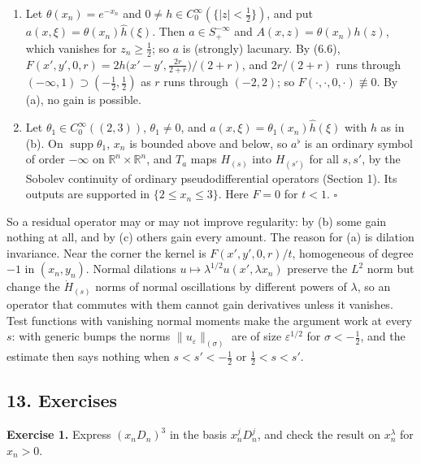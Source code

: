 \documentclass[
  11pt,
]{article}
\begin{document}
\begin{enumerate}
\def\labelenumi{(\alph{enumi})}
\setcounter{enumi}{1}
\item
  Let \(\theta(x_n)=e^{-x_n}\) and
  \(0\neq h\in C_0^\infty(\{|z|<\tfrac12\})\), and put
  \(a(x,\xi)=\theta(x_n)\widehat h(\xi)\). Then \(a\in S^{-\infty}_+\)
  and \(A(x,z)=\theta(x_n)h(z)\), which vanishes for
  \(z_n\geq\tfrac12\); so \(a\) is (strongly) lacunary. By (6.6),
  \(F(x',y',0,r)=2h\big(x'-y',\tfrac{2r}{2+r}\big)/(2+r)\), and
  \(2r/(2+r)\) runs through \((-\infty,1)\supset(-\tfrac12,\tfrac12)\)
  as \(r\) runs through \((-2,2)\); so
  \(F(\cdot,\cdot,0,\cdot)\not\equiv0\). By (a), no gain is possible.
\item
  Let \(\theta_1\in C_0^\infty((2,3))\), \(\theta_1\neq0\), and
  \(a(x,\xi)=\theta_1(x_n)\widehat h(\xi)\) with \(h\) as in (b). On
  \(\operatorname{supp}\theta_1\), \(x_n\) is bounded above and below,
  so \(a^\flat\) is an ordinary symbol of order \(-\infty\) on
  \(\mathbb R^n\times\mathbb R^n\), and \(T_a\) maps \(H_{(s)}\) into
  \(H_{(s')}\) for all \(s,s'\), by the Sobolev continuity of ordinary
  pseudodifferential operators (Section 1). Its outputs are supported in
  \(\{2\leq x_n\leq3\}\). Here \(F=0\) for \(t<1\). \(\square\)
\end{enumerate}

So a residual operator may or may not improve regularity: by (b) some
gain nothing at all, and by (c) others gain every amount. The reason for
(a) is dilation invariance. Near the corner the kernel is
\(F(x',y',0,r)/t\), homogeneous of degree \(-1\) in \((x_n,y_n)\).
Normal dilations \(u\mapsto\lambda^{1/2}u(x',\lambda x_n)\) preserve the
\(L^2\) norm but change the \(\dot H_{(s)}\) norms of normal
oscillations by different powers of \(\lambda\), so an operator that
commutes with them cannot gain derivatives unless it vanishes. Test
functions with vanishing normal moments make the argument work at every
\(s\): with generic bumps the norms \(\|u_\varepsilon\|_{(\sigma)}\) are
of size \(\varepsilon^{1/2}\) for \(\sigma<-\tfrac12\), and the estimate
then says nothing when \(s<s'<-\tfrac12\) or \(\tfrac12<s<s'\).

\subsection{13. Exercises}\label{exercises}

\textbf{Exercise 1.} Express \((x_nD_n)^3\) in the basis \(x_n^jD_n^j\),
and check the result on \(x_n^\lambda\) for \(x_n>0\).
\end{document}
